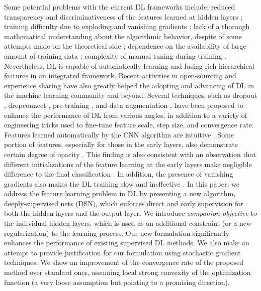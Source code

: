 \documentclass{article} %
\begin{document}
Some potential problems with the current DL frameworks include: reduced transparency and discriminativeness of the features learned at hidden layers \cite{Zeiler13}; training difficulty due to exploding and vanishing gradients \cite{Glorot10,Pascanu14}; lack of a thorough mathematical understanding about the algorithmic behavior, despite of some attempts made on the theoretical side \cite{Eigen14}; dependence on the availability of large amount of training data \cite{dropout}; complexity of manual tuning during training \cite{imagenet}. Nevertheless, DL is capable of automatically learning and fusing rich hierarchical features in an integrated framework.
Recent activities in open-sourcing and experience sharing \cite{dropout,DeCAF,theano} have also greatly helped the adopting and advancing of DL in the machine learning community and beyond. Several techniques, such as dropout \cite{dropout}, dropconnect \cite{dropcon}, pre-training \cite{Dahl12}, and data augmentation \cite{mulCOL}, have been proposed to enhance the performance of DL from various angles, in addition to a variety of engineering tricks used to fine-tune feature scale, step size, and convergence rate. Features learned automatically by the CNN algorithm \cite{CNN} are intuitive \cite{Zeiler13}. Some portion of features, especially for those in the early layers, also demonstrate certain degree of opacity \cite{Zeiler13}. This finding is also consistent with an observation that different initializations of the feature learning at the early layers make negligible difference  to the final classification \cite{Dahl12}. In addition, the presence of vanishing gradients also makes the DL training slow and ineffective \cite{Glorot10}. In this paper, we address the feature learning problem in DL by presenting a new algorithm, deeply-supervised nets (DSN), which enforces direct and early supervision for both the hidden layers and the output layer. We introduce {\em companion objective} to the individual hidden layers, which is used as an additional constraint (or a new regularization) to the learning process. 
Our new formulation significantly enhances the performance of existing supervised DL methods. We also make an attempt to provide justification for our formulation using stochastic gradient techniques. We show an improvement of the convergence rate of the proposed method over standard ones, assuming local strong convexity of the optimization function (a very loose assumption but pointing to a promising direction).
\end{document}

